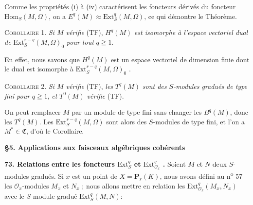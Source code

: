 %
%
%
%
Comme les propriétés (i) à (iv) caractérisent les foncteurs dérivés du foncteur $\mathrm{Hom}_S(M, \Omega)$, on a $E^q(M) \approx \mathrm{Ext}_S^q(M, \Omega)$, ce qui démontre le Théorème.

\textsc{Corollaire} 1. \textit{Si $M$ vérifie} (TF), $H^q(M)$ \textit{est isomorphe à l'espace vectoriel dual de} $\mathrm{Ext}_S^{r-q}(M, \Omega)_0$ \textit{pour tout} $q \geqq 1$.

En effet, nous savons que $H^q(M)$ est un espace vectoriel de dimension finie dont le dual est isomorphe à $\mathrm{Ext}_S^{r-q}(M, \Omega)_0$ .

\textsc{Corollaire} 2. \textit{Si $M$ vérifie} (TF), \textit{les} $T^q(M)$ \textit{sont des $S$-modules gradués de type fini pour} $q \geqq 1$, \textit{et} $T^0(M)$ \textit{vérifie} (TF).

On peut remplacer $M$ par un module de type fini sans changer les $B^q(M)$, donc les $T^q(M)$. Les $\mathrm{Ext}_S^{r-q}(M, \Omega)$ sont alors des $S$-modules de type fini, et l'on a $M^* \in \mathfrak{C}$, d'où le Corollaire.

\begin{center}
\textbf{\S5. Applications aux faisceaux algébriques cohérents}
\end{center}

\textbf{73. Relations entre les foncteurs $\mathrm{Ext}_S^q$ et $\mathrm{Ext}_{\mathcal{O}_x}^q$ .} Soient $M$ et $N$ deux $S$-modules gradués. Si $x$ est un point de $X = \mathbf{P}_r(K)$, nous avons défini au n\textsuperscript{o} 57 les $\mathcal{O}_x$-modules $M_x$ et $N_x$ ; nous allons mettre en relation les $\mathrm{Ext}_{\mathcal{O}_x}^q(M_x , N_x)$ avec le $S$-module gradué $\mathrm{Ext}_S^q(M, N)$:

